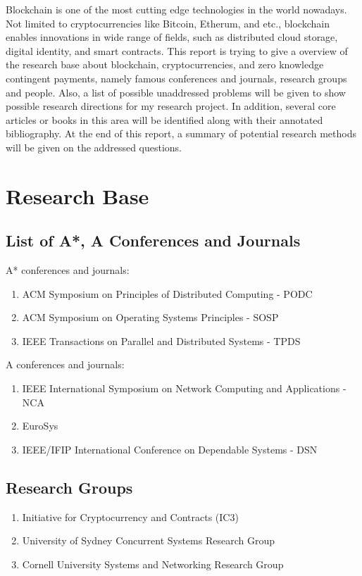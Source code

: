 Blockchain is one of the most cutting edge technologies in the world nowadays. Not limited to cryptocurrencies like Bitcoin, Etherum, and etc., blockchain enables innovations in wide range of fields, such as distributed cloud storage, digital identity, and smart contracts.
\newline
\newline
This report is trying to give a overview of the research base about blockchain, cryptocurrencies, and zero knowledge contingent payments, namely famous conferences and journals, research groups and people. Also, a list of possible unaddressed problems will be given to show possible research directions for my research project. In addition, several core articles or books in this area will be identified along with their annotated bibliography. At the end of this report, a summary of potential research methods will be given on the addressed questions.

\section{Research Base}
\label{sec:research base}

\subsection{List of A*, A Conferences and Journals}
A* conferences and journals:
\begin{enumerate}
\item ACM Symposium on Principles of Distributed Computing - PODC
\item ACM Symposium on Operating Systems Principles - SOSP
\item IEEE Transactions on Parallel and Distributed Systems - TPDS
\end{enumerate}
A conferences and journals:
\begin{enumerate}
\item IEEE International Symposium on Network Computing and Applications - NCA
\item EuroSys
\item IEEE/IFIP International Conference on Dependable Systems - DSN
\end{enumerate}

\subsection{Research Groups}

\begin{enumerate}
\item Initiative for Cryptocurrency and Contracts (IC3) 
\item University of Sydney Concurrent Systems Research Group
\item Cornell University Systems and Networking Research Group
\end{enumerate}

